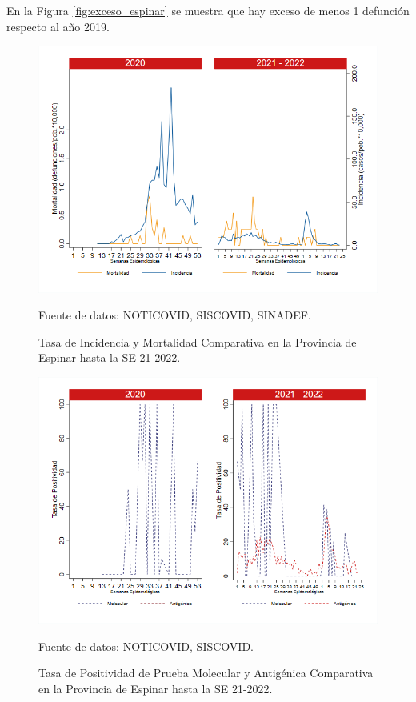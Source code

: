 \documentclass[12pt,a4paper,openany]{book}
\begin{document}
	En la Figura \ref{fig:exceso_espinar} se muestra que hay exceso de menos 1 defunción respecto al año 2019.
	
	\begin{figure}[h]
		\caption{Tasa de Incidencia y Mortalidad Comparativa en la Provincia de Espinar hasta la SE 21-2022.}\label{fig:inc_mort_espinar}
		\begin{center}
			\includegraphics[width=0.85\linewidth]{../figuras/incidencia_mortalidad_20_21_8.png}
		\end{center}
		{\footnotesize {Fuente de datos: NOTICOVID, SISCOVID, SINADEF.}}
	\end{figure}
	
	\begin{figure}[h]
		\caption{Tasa de Positividad de Prueba Molecular y Antigénica Comparativa en la Provincia de Espinar hasta la SE 21-2022.}\label{fig:positividad_espinar}
		\begin{center}
			\includegraphics[width=0.7\linewidth]{../figuras/positividad_20_21_8.png}
		\end{center}
		{\footnotesize {Fuente de datos: NOTICOVID, SISCOVID.}}
	\end{figure}
	
\end{document}
